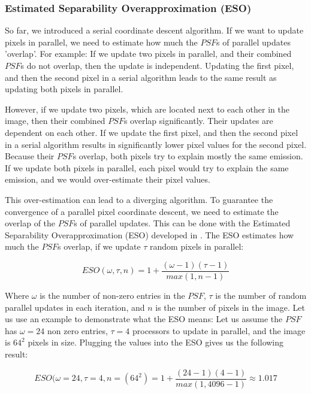 \subsubsection{Estimated Separability Overapproximation (ESO)} \label{pcdm:pcdm:eso}
So far, we introduced a serial coordinate descent algorithm. If we want to update pixels in parallel, we need to estimate how much the $PSF$s of parallel updates 'overlap'. For example: If we update two pixels in parallel, and their combined $PSF$s do not overlap, then the update is independent. Updating the first pixel, and then the second pixel in a serial algorithm leads to the same result as updating both pixels in parallel. 

However, if we update two pixels, which are located next to each other in the image, then their combined $PSF$s overlap significantly. Their updates are dependent on each other. If we update the first pixel, and then the second pixel in a serial algorithm results in significantly lower pixel values for the second pixel. Because their $PSF$s overlap, both pixels try to explain mostly the same emission. If we update both pixels in parallel, each pixel would try to explain the same emission, and we would over-estimate their pixel values.

This over-estimation can lead to a diverging algorithm. To guarantee the convergence of a parallel pixel coordinate descent, we need to estimate the overlap of the $PSF$s of parallel updates. This can be done with the Estimated Separability Overapproximation (ESO) developed in \cite{richtarik2016parallel}. The ESO estimates how much the $PSF$s overlap, if we update $\tau$ random pixels in parallel:

\begin{equation}\label{pcdm:pcdm:eso}
ESO(\omega, \tau, n) = 1+ \frac{(\omega - 1)(\tau - 1)}{max(1, n -1)}
\end{equation}

Where $\omega$ is the number of non-zero entries in the $PSF$, $\tau$ is the number of random parallel updates in each iteration, and $n$ is the number of pixels in the image. Let us use an example to demonstrate what the ESO means: Let us assume the $PSF$ has $\omega = 24$ non zero entries, $\tau = 4$ processors to update in parallel, and the image is $64^2$ pixels in size. Plugging the values into the ESO gives us the following result:

\begin{equation}
ESO(\omega = 24, \tau = 4, n = (64^2) = 1+ \frac{(24 - 1)(4 - 1)}{max(1, 4096 -1)} \approx 1.017
\end{equation}

